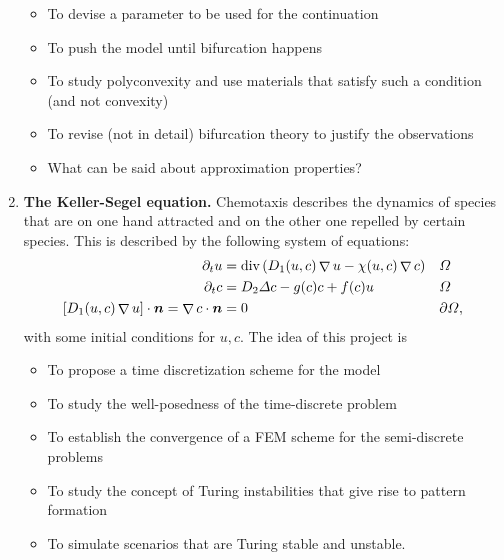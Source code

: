 \documentclass{article}
\renewcommand{\vec}{\vectorsym}
\DeclareMathOperator{\grad}{\nabla}
\DeclareMathOperator{\dive}{\text{div}}
\begin{document}
\begin{enumerate}
\begin{itemize}
                \item To devise a parameter to be used for the continuation 
                \item To push the model until bifurcation happens
                \item To study polyconvexity and use materials that satisfy such a condition (and not convexity)
                \item To revise (not in detail) bifurcation theory to justify the observations
                \item What can be said about approximation properties? 
            \end{itemize}
    \item \textbf{The Keller-Segel equation.} Chemotaxis describes the dynamics of species that are on one hand attracted and on the other one repelled by certain species. This is described by the following system of equations: 
        $$\begin{aligned}
            \partial_t u &= \dive\left(D_1(u,c)\grad u - \chi(u,c) \grad c\right) && \Omega \\
            \partial_t c &= D_2\Delta c - g(c) c + f(c) u && \Omega \\
            [D_1(u,c)\grad u]\cdot \vec n = \grad c\cdot \vec n &= 0 && \partial \Omega,
        \end{aligned} $$
        with some initial conditions for $u,c$. The idea of this project is
        \begin{itemize}
            \item To propose a time discretization scheme for the model 
            \item To study the well-posedness of the time-discrete problem
            \item To establish the convergence of a FEM scheme for the semi-discrete problems
            \item To study the concept of Turing instabilities that give rise to pattern formation
            \item To simulate scenarios that are Turing stable and unstable. 
        \end{itemize}


\end{enumerate}
\end{document}
